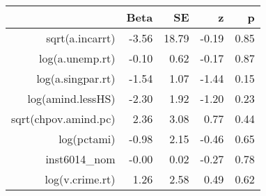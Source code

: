 \begin{table}[ht]
\centering
\begin{tabular}{rrrrr}
  \hline
 & Beta & SE & z & p \\ 
  \hline
sqrt(a.incarrt) & -3.56 & 18.79 & -0.19 & 0.85 \\ 
  log(a.unemp.rt) & -0.10 & 0.62 & -0.17 & 0.87 \\ 
  log(a.singpar.rt) & -1.54 & 1.07 & -1.44 & 0.15 \\ 
  log(amind.lessHS) & -2.30 & 1.92 & -1.20 & 0.23 \\ 
  sqrt(chpov.amind.pc) & 2.36 & 3.08 & 0.77 & 0.44 \\ 
  log(pctami) & -0.98 & 2.15 & -0.46 & 0.65 \\ 
  inst6014\_nom & -0.00 & 0.02 & -0.27 & 0.78 \\ 
  log(v.crime.rt) & 1.26 & 2.58 & 0.49 & 0.62 \\ 
   \hline
\end{tabular}
\end{table}
